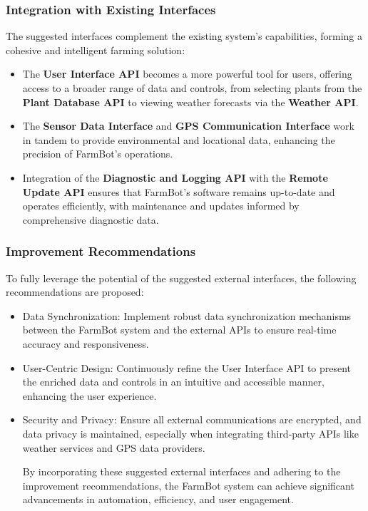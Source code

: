 \subsubsection{Integration with Existing Interfaces}

The suggested interfaces complement the existing system's capabilities, forming a cohesive and intelligent farming solution:
\begin{itemize}
 

   \item  The \textbf{User Interface API} becomes a more powerful tool for users, offering access to a broader range of data and controls, from selecting plants from the \textbf{Plant Database API} to viewing weather forecasts via the \textbf{Weather API}.
   \item The \textbf{Sensor Data Interface} and \textbf{GPS Communication Interface} work in tandem to provide environmental and locational data, enhancing the precision of FarmBot's operations.
   \item  Integration of the \textbf{Diagnostic and Logging API} with the \textbf{Remote Update API} ensures that FarmBot's software remains up-to-date and operates efficiently, with maintenance and updates informed by comprehensive diagnostic data.
\end{itemize}
\subsubsection{Improvement Recommendations}

To fully leverage the potential of the suggested external interfaces, the following recommendations are proposed:

\begin{itemize}
  

  \item  Data Synchronization: Implement robust data synchronization mechanisms between the FarmBot system and the external APIs to ensure real-time accuracy and responsiveness.
  \item  User-Centric Design: Continuously refine the User Interface API to present the enriched data and controls in an intuitive and accessible manner, enhancing the user experience.
  \item  Security and Privacy: Ensure all external communications are encrypted, and data privacy is maintained, especially when integrating third-party APIs like weather services and GPS data providers.

By incorporating these suggested external interfaces and adhering to the improvement recommendations, the FarmBot system can achieve significant advancements in automation, efficiency, and user engagement.
\end{itemize}

